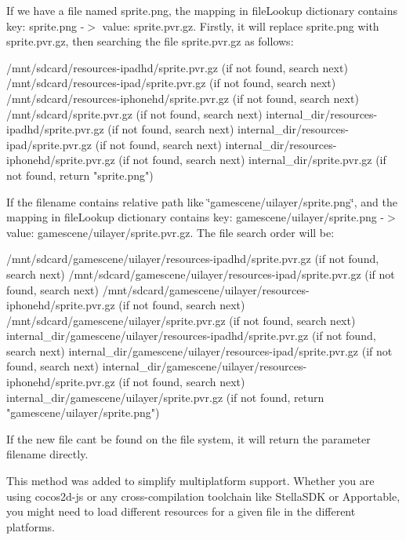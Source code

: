 If we have a file named \textquotesingle{}sprite.\+png\textquotesingle{}, the mapping in file\+Lookup dictionary contains {\ttfamily key\+: sprite.\+png -\/$>$ value\+: sprite.\+pvr.\+gz}. Firstly, it will replace \textquotesingle{}sprite.\+png\textquotesingle{} with \textquotesingle{}sprite.\+pvr.\+gz\textquotesingle{}, then searching the file sprite.\+pvr.\+gz as follows\+: \begin{DoxyVerb}/mnt/sdcard/resources-ipadhd/sprite.pvr.gz      (if not found, search next)
/mnt/sdcard/resources-ipad/sprite.pvr.gz        (if not found, search next)
/mnt/sdcard/resources-iphonehd/sprite.pvr.gz    (if not found, search next)
/mnt/sdcard/sprite.pvr.gz                       (if not found, search next)
internal_dir/resources-ipadhd/sprite.pvr.gz     (if not found, search next)
internal_dir/resources-ipad/sprite.pvr.gz       (if not found, search next)
internal_dir/resources-iphonehd/sprite.pvr.gz   (if not found, search next)
internal_dir/sprite.pvr.gz                      (if not found, return "sprite.png")
\end{DoxyVerb}


If the filename contains relative path like \char`\"{}gamescene/uilayer/sprite.\+png\char`\"{}, and the mapping in file\+Lookup dictionary contains {\ttfamily key\+: gamescene/uilayer/sprite.\+png -\/$>$ value\+: gamescene/uilayer/sprite.\+pvr.\+gz}. The file search order will be\+: \begin{DoxyVerb} /mnt/sdcard/gamescene/uilayer/resources-ipadhd/sprite.pvr.gz      (if not found, search next)
 /mnt/sdcard/gamescene/uilayer/resources-ipad/sprite.pvr.gz        (if not found, search next)
 /mnt/sdcard/gamescene/uilayer/resources-iphonehd/sprite.pvr.gz    (if not found, search next)
 /mnt/sdcard/gamescene/uilayer/sprite.pvr.gz                       (if not found, search next)
 internal_dir/gamescene/uilayer/resources-ipadhd/sprite.pvr.gz     (if not found, search next)
 internal_dir/gamescene/uilayer/resources-ipad/sprite.pvr.gz       (if not found, search next)
 internal_dir/gamescene/uilayer/resources-iphonehd/sprite.pvr.gz   (if not found, search next)
 internal_dir/gamescene/uilayer/sprite.pvr.gz                      (if not found, return "gamescene/uilayer/sprite.png")
\end{DoxyVerb}


If the new file can\textquotesingle{}t be found on the file system, it will return the parameter filename directly.

This method was added to simplify multiplatform support. Whether you are using cocos2d-\/js or any cross-\/compilation toolchain like Stella\+S\+DK or Apportable, you might need to load different resources for a given file in the different platforms.

